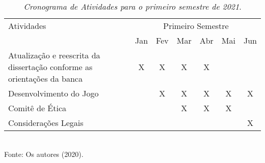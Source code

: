 \captionsetup[table]{name=Quadro}
\begin{table}[!htb]
    \centering
    \renewcommand{\arraystretch}{1.5} %
    \caption{\emph{Cronograma de Atividades para o primeiro semestre de 2021}.}\label{tabelinha}
    \vspace{0.2cm}
    \begin{tabular}{|p{8cm}|c|c|c|c|c|c|}
    \hline
    Atividades & \multicolumn{6}{|c|}{Primeiro Semestre} \\
    \cline{2-7}                                                                             & Jan   & Fev   & Mar   & Abr   & Mai   & Jun   \\
    \hline Atualização e reescrita da dissertação conforme as orientações da banca          & X     & X     & X     & X     &       &       \\
    \hline Desenvolvimento do Jogo                                                          &       & X     & X     & X     & X     & X     \\
    \hline Comitê de Ética                                                                  &       &       & X     & X     & X     &      \\
    \hline Considerações Legais                                                             &       &       &       &       &       & X     \\
    \hline
    \end{tabular} 
    \\
    Fonte: Os autores (2020).
\end{table}

